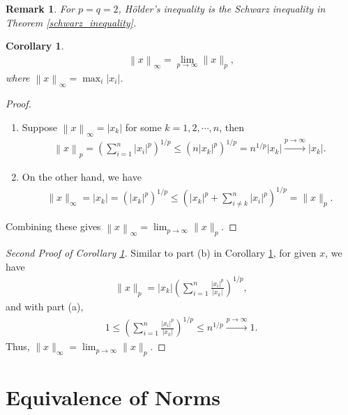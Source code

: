 \documentclass[10pt]{book}
\newtheorem{corollary}{Corollary}[theorem]
\newtheorem{remark}{Remark}[chapter]
\theoremstyle{definition}
\numberwithin{equation}{chapter}
\begin{document}
\begin{remark}
For $p = q = 2$, Hölder's inequality is the Schwarz inequality in Theorem \ref{schwarz_inequality}.
\end{remark}

\medskip

\begin{corollary}\label{norm_limit_corollary}
\begin{align*}
    \left\|x\right\|_\infty = \lim_{p\to\infty} \|x\|_p,
\end{align*}
where $\left\|x\right\|_\infty = \max_{i}|x_i|$.
\end{corollary}
\begin{proof}
~\begin{enumerate}[label=(\alph*)]
    \item Suppose $\left\|x\right\|_\infty = |x_k|$ for some $k = 1,2,\cdots, n$, then
    \begin{align*}
        \left\|x\right\|_p = \left(\sum^n_{i=1}|x_i|^p\right)^{1/p} \leq \left(n |x_k|^p\right)^{1/p} = n^{1/p} |x_k| \xrightarrow[]{p\to\infty} |x_k|.
    \end{align*}
    
    \item On the other hand, we have
    \begin{align*}
        \|x\|_\infty = |x_k| = \left(|x_k|^p\right)^{1/p} \leq \left(|x_k|^p + \sum^n_{i\neq k} |x_i|^p \right)^{1/p} = \|x\|_p.
    \end{align*}
\end{enumerate}
Combining these gives $\left\|x\right\|_\infty = \lim_{p\to\infty} \|x\|_p$.
\end{proof}

\begin{proof}[Second Proof of Corollary \ref{norm_limit_corollary}]
Similar to part (b) in Corollary \ref{norm_limit_corollary}, for given $x$, we have
\begin{align*}
    \|x\|_p = |x_k| \left(\sum^n_{i=1} \frac{|x_i|^p}{|x_k|} \right)^{1/p},
\end{align*}
and with part (a),
\begin{align*}
    1 \leq \left(\sum^n_{i=1} \frac{|x_i|^p}{|x_k|} \right)^{1/p} \leq n^{1/p} \xrightarrow[]{p\to\infty} 1.
\end{align*}
Thus, $\|x\|_\infty = \lim_{p\to\infty} \|x\|_p$.
\end{proof}

\medskip

\section{Equivalence of Norms}
\end{document}
